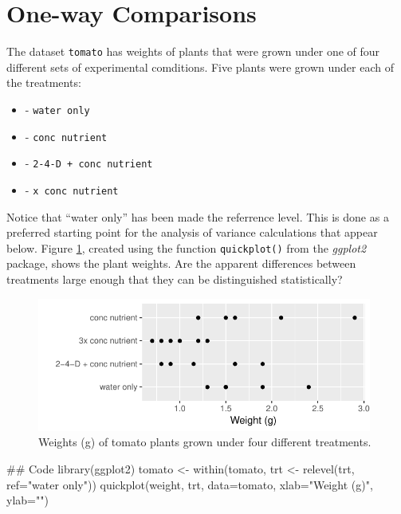 \documentclass{tufte-book}\usepackage[]{graphicx}\usepackage[]{color}
\newcommand{\txtt}[1]{\texttt{#1}}
\newenvironment{itemizz}%
  {\begin{itemize} %
    \setlength{\itemsep}{2pt}%
    \setlength{\parskip}{2pt}} %
  {\end{itemize}}
\begin{document}
\section{One-way Comparisons}

The dataset \txtt{tomato} has weights of plants that were grown
under one of four different sets of experimental comditions.
Five plants were grown under each of the treatments:
\begin{itemizz}
  \item[-] \txtt{water only}
  \item[-] \txtt{conc nutrient}
  \item[-] \txtt{2-4-D + conc nutrient}
  \item[-] \txtt{x conc nutrient}
\end{itemizz}
Notice that ``water only'' has been made the referrence level.  This
is done as a preferred starting point for the analysis of variance
calculations that appear below.  Figure \ref{fig:Tomato}, created
using the function \txtt{quickplot()} from the {\em ggplot2} package,
shows the plant weights.  Are the apparent differences between
treatments large enough that they can be distinguished statistically?

\begin{figure}
\vspace*{-6pt}
\begin{Schunk}


\centerline{\includegraphics[width=0.98\textwidth]{figs/05-gg-tomato-1} }

\end{Schunk}
\caption{Weights (g) of tomato plants grown under four different
  treatments.\label{fig:Tomato}}
\end{figure}
\begin{fullwidth}

\begin{Schunk}
\begin{Sinput}
## Code
library(ggplot2)
tomato <- within(tomato, trt <- relevel(trt, ref="water only"))
quickplot(weight, trt, data=tomato, xlab="Weight (g)", ylab="")
\end{Sinput}
\end{Schunk}

\end{fullwidth}
\end{document}
